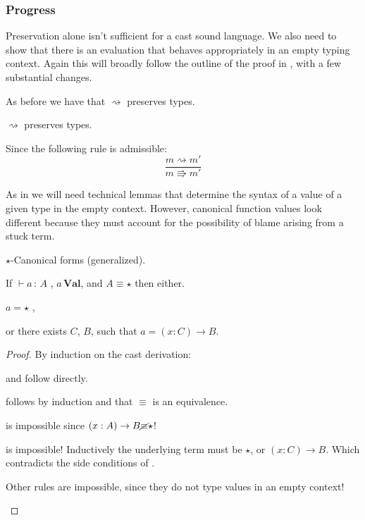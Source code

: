  
\subsubsection{Progress}
 
Preservation alone isn't sufficient for a cast sound language.
We also need to show that there is an evaluation that behaves appropriately in an empty typing context.
Again this will broadly follow the outline of the \slang{} proof in , with a few substantial changes.

As before we have that $\rightsquigarrow$ preserves types.
 
\begin{fact} $\rightsquigarrow$ preserves types.
 
Since the following rule is admissible:
\[
\frac{m\rightsquigarrow m'}{m\Rrightarrow m'}
\]
\end{fact}
 
As in  we will need technical lemmas that determine the syntax of a value of a given type in the empty context.
However, canonical function values look different because they must account for the possibility of blame arising from a stuck term.

\begin{lem} $\star$-Canonical forms (generalized).
 
If $\vdash a\,:\,A$ , $a\,\textbf{Val}$, and $A\equiv\star$ then either.

\textup{$a=\star$ ,}

\textup{or there exists $C$, $B$, such that $a=\left(x:C\right)\rightarrow B$.}
\end{lem}
\begin{proof}
By induction on the cast derivation:
\begin{casenv}
 \item {} and  follow directly.
 \item {} follows by induction and that $\equiv$ is an equivalence.
 \item {} is impossible since $\left(x:A\right)\rightarrow B\cancel{\equiv}\star$!
 \item {} is impossible!
   Inductively the underlying term must be $\star$, or $\left(x:C\right)\rightarrow B$.
   Which contradicts the side conditions of .
 \item Other rules are impossible, since they do not type values in an empty context!
\end{casenv}
\end{proof}

